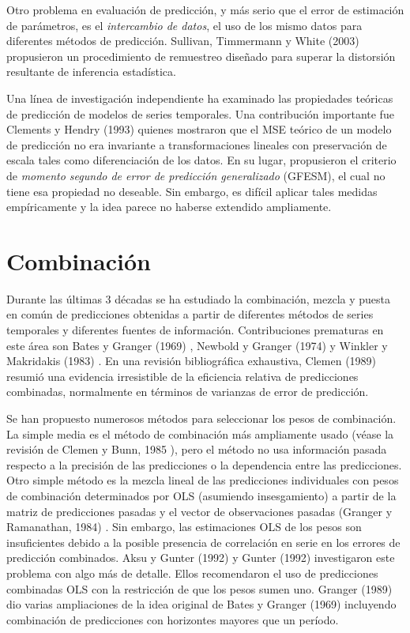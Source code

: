 \documentclass{llncs}
\begin{document}
Otro problema en evaluación de predicción, y más serio que el error de estimación de parámetros, es el \emph{intercambio de datos}, el uso de los mismo datos para diferentes métodos de predicción. Sullivan, Timmermann y White (2003) \cite{Sullivan2003217} propusieron un procedimiento de remuestreo diseñado para superar la distorsión resultante de inferencia estadística.

Una línea de investigación independiente ha examinado las propiedades teóricas de predicción de modelos de series temporales. Una contribución importante fue Clements y Hendry (1993) \cite{Clements1993617} quienes mostraron que el MSE teórico de un modelo de predicción no era invariante a transformaciones lineales con preservación de escala tales como diferenciación de los datos. En su lugar, propusieron el criterio de \emph{momento segundo de error de predicción generalizado} (GFESM), el cual no tiene esa propiedad no deseable. Sin embargo, es difícil aplicar tales medidas empíricamente y la idea parece no haberse extendido ampliamente.

\section{Combinación}
Durante las últimas 3 décadas se ha estudiado la combinación, mezcla y puesta en común de predicciones obtenidas a partir de diferentes métodos de series temporales y diferentes fuentes de información. Contribuciones prematuras en este área son Bates y Granger (1969) \cite{BATESJM1969451}, Newbold y Granger (1974) \cite{Newbold1974131} y Winkler y Makridakis (1983) \cite{Winkler1983150}. En una revisión bibliográfica exhaustiva, Clemen (1989) \cite{Clemen1989559} resumió una evidencia irresistible de la eficiencia relativa de predicciones combinadas, normalmente en términos de varianzas de error de predicción.

Se han propuesto numerosos métodos para seleccionar los pesos de combinación. La simple media es el método de combinación más ampliamente usado (véase la revisión de Clemen y Bunn, 1985 \cite{Bunn1985151}), pero el método no usa información pasada respecto a la precisión de las predicciones o la dependencia entre las predicciones. Otro simple método es la mezcla lineal de las predicciones individuales con pesos de combinación determinados por OLS (asumiendo insesgamiento) a partir de la matriz de predicciones pasadas y el vector de observaciones pasadas (Granger y Ramanathan, 1984) \cite{Granger1984197}. Sin embargo, las estimaciones OLS de los pesos son insuficientes debido a la posible presencia de correlación en serie en los errores de predicción combinados. Aksu y Gunter (1992) \cite{Aksu199227} y Gunter (1992) \cite{Gunter199245} investigaron este problema con algo más de detalle. Ellos recomendaron el uso de predicciones combinadas OLS con la restricción de que los pesos sumen uno. Granger (1989) \cite{Granger1989167} dio varias ampliaciones de la idea original de Bates y Granger (1969) \cite{BATESJM1969451} incluyendo combinación de predicciones con horizontes mayores que un período.
\end{document}
